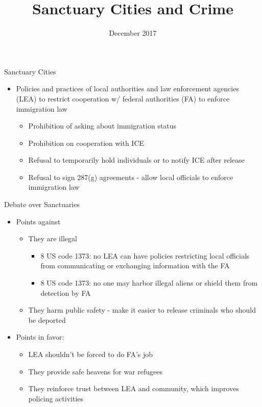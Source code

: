 \documentclass[xcolor=pdftex,dvipsnames,table]{beamer}
\author[Short Name (U ABC)]{%
  \texorpdfstring{%
    \begin{columns}
      \column{.3333\linewidth}
      \centering
      Jaime Arellano-Bover \\ Stanford
      \column{.3333\linewidth}
      \centering
      Barbara Biasi \\ Princeton
    \end{columns}
 }
 {Jaime Arellano-Bover, Barbara Biasi}
}
\begin{document}
\title[Sanctuary cities and crime]{Sanctuary Cities and Crime}

\date{December 2017}

\maketitle

\begin{frame}{Sanctuary Cities}
\begin{itemize}
\item Policies and practices of local authorities and law enforcement agencies (LEA) to restrict cooperation w/ federal authorities (FA) to enforce immigration law
\begin{itemize}
\item Prohibition of asking about immigration status
\item Prohibition on cooperation with ICE
\item Refusal to temporarily hold individuals or to notify ICE after release
\item Refusal to sign 287(g) agreements - allow local officials to enforce immigration law
\end{itemize}
\end{itemize}
\end{frame}

\begin{frame}{Debate over Sanctuaries}
\begin{itemize}
\item Points against
\begin{itemize}
\item They are illegal
\begin{itemize}
\item 8 US code 1373: no LEA can have policies restricting local officials from communicating or exchanging information with the FA
\item 8 US code 1373: no one may harbor illegal aliens or shield them from detection by FA
\end{itemize}
\item They harm public safety - make it easier to release criminals who should be deported
\end{itemize}
\item Points in favor:
\begin{itemize}
\item LEA shouldn't be forced to do FA's job
\item They provide safe heavens for war refugees
\item They reinforce trust between LEA and community, which improves policing activities
\end{itemize}
\end{itemize}
\end{frame}
\end{document}
